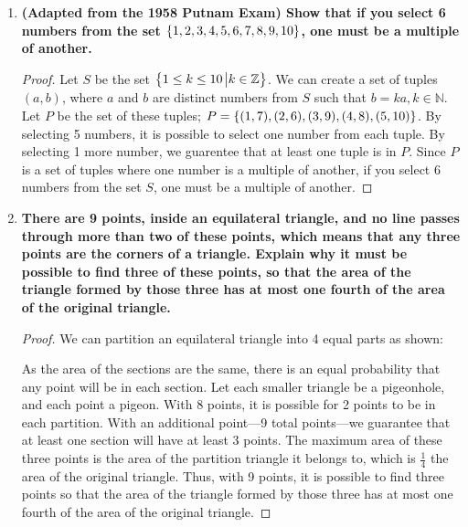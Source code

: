 \documentclass[article, 12pt]{article}
\theoremstyle{definition}
\DeclarePairedDelimiter\set{\{}{\}}
\newcommand{\ints}{\mathbb{Z}}
\newcommand{\nats}{\mathbb{N}}
\begin{document}
\begin{enumerate}[(1)]
\begin{proof}
    \end{proof}
    \item \textbf{(Adapted from the 1958 Putnam Exam) Show that if you select 6 numbers from the set $\set*{1, 2, 3, 4, 5, 6, 7, 8, 9, 10}$, one must be a multiple of another.}
    \begin{proof}
        Let $S$ be the set $\set*{1 \leq k \leq 10 \eval k \in \ints}$. We can create a set of tuples $(a,b)$, where $a$ and $b$ are distinct numbers from $S$ such that $b=ka, k \in \nats$. Let $P$ be the set of these tuples; $P = \set*{(1,7), (2,6), (3,9), (4,8), (5,10)}$. By selecting 5 numbers, it is possible to select one number from each tuple. By selecting 1 more number, we guarentee that at least one tuple is in $P$. Since $P$ is a set of tuples where one number is a multiple of another, if you select 6 numbers from the set $S$, one must be a multiple of another.
    \end{proof}
    \item \textbf{There are 9 points, inside an equilateral triangle, and no line passes through more than two of these points, which means that any three points are the corners of a triangle. Explain why it must be possible to find three of these points, so that the area of the triangle formed by those three has at most one fourth of the area of the original triangle.} \label{question:equilateral}
    \begin{proof}
        We can partition an equilateral triangle into 4 equal parts as shown:
        \begin{figure}[H]
            \centering
        \end{figure}
        As the area of the sections are the same, there is an equal probability that any point will be in each section. Let each smaller triangle be a pigeonhole, and each point a pigeon. With 8 points, it is possible for 2 points to be in each partition. With an additional point---9 total points---we guarantee that at least one section will have at least 3 points. The maximum area of these three points is the area of the partition triangle it belongs to, which is $\frac{1}{4}$ the area of the original triangle. Thus, with 9 points, it is possible to find three points so that the area of the triangle formed by those three has at most one fourth of the area of the original triangle.
    \end{proof}
\end{enumerate}
\end{document}
